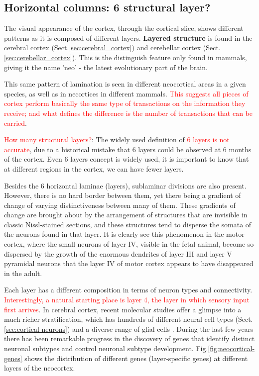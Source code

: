 \subsection{Horizontal columns: 6 structural layer?}
\label{sec:layered_structure}
\label{sec:neocortex-6-layers}
\label{sec:horizontal-columns}

The visual appearance of the cortex, through the cortical slice, shows different
patterns as it is composed of different layers. {\bf Layered structure} is found
in the cerebral cortex (Sect.\ref{sec:cerebral_cortex}) and cerebellar cortex
(Sect.\ref{sec:cerebellar_cortex}). This is the distinguish feature only found
in mammals, giving it the name 'neo' - the latest evolutionary part of the
brain.

This same pattern of lamination is seen in different neocortical areas in a
given species, as well as in necortices in different mammals.
\textcolor{red}{This suggests all pieces of cortex perform basically the same
type of transactions on the information they receive; and what defines the
difference is the number of transactions that can be carried}.

\textcolor{red}{How many structural layers?}: The widely used definition of
\textcolor{red}{6 layers is not accurate}, due to a historical mistake that 6
layers could be observed at 6 months of the cortex. Even 6 layers concept is
widely used, it is important to know that at different regions in the cortex, we
can have fewer layers.

Besides the 6 horizontal laminae (layers), sublaminar divisions are also
present.  However, there is no hard border between them, yet there being a
gradient of change of varying distinctiveness between many of them.
These gradients of change are brought about by the arrangement of structures
that are invisible in classic Nissl-stained sections, and these structures tend
to disperse the somata of the neurons found in that layer. It is clearly see
this phenomenon in the motor cortex, where the small neurons of layer IV,
visible in the fetal animal, become so dispersed by the growth of the enormous
dendrites of layer III and layer V pyramidal neurons that the layer IV of motor
cortex appears to have disappeared in the adult.

Each layer has a different composition in terms of neuron types and
connectivity. \textcolor{red}{Interestingly, a natural starting place
is layer 4, the layer in which sensory input first arrives}.
In cerebral cortex, recent molecular studies offer a glimpse into a much
richer stratification, which has hundreds of different neural cell types
(Sect.\ref{sec:cortical-neurons}) and a diverse range of glial cells
\citep{lein2007, molyneaux2007}.
During the last few years there has been remarkable progress in the discovery of
genes that identify distinct neuronal subtypes and control neuronal subtype
development.
Fig.\ref{fig:neocortical-genes} shows the distribution of different genes
(layer-specific genes) at different layers of the neocortex.

